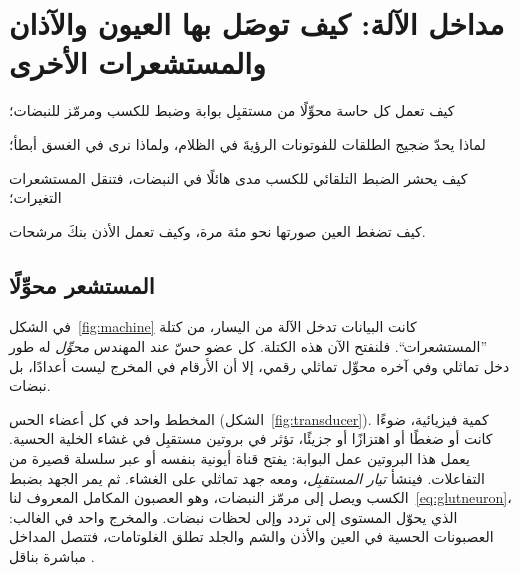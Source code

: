 \chapter{مداخل الآلة: كيف توصَل بها العيون والآذان والمستشعرات الأخرى}
\label{sec:sensors}
\begin{chaptergoals}
\item كيف تعمل كل حاسة محوِّلًا من مستقبِل بوابة وضبط للكسب ومرمّز للنبضات؛
\item لماذا يحدّ ضجيج الطلقات للفوتونات الرؤيةَ في الظلام، ولماذا نرى في الغسق أبطأ؛
\item كيف يحشر الضبط التلقائي للكسب مدى هائلًا في النبضات، فتنقل المستشعرات التغيرات؛
\item كيف تضغط العين صورتها نحو مئة مرة، وكيف تعمل الأذن بنكَ مرشحات.
\end{chaptergoals}

\section{المستشعر محوِّلًا}

في الشكل~\ref{fig:machine} كانت البيانات تدخل الآلة من اليسار، من كتلة ”المستشعرات“. فلنفتح الآن هذه الكتلة. كل عضو حسّ عند المهندس \emph{محوِّل} له طور دخل تماثلي وفي آخره محوِّل تماثلي رقمي، إلا أن الأرقام في المخرج ليست أعدادًا، بل نبضات.

المخطط واحد في كل أعضاء الحس (الشكل~\ref{fig:transducer}). كمية فيزيائية، ضوءًا كانت أو ضغطًا أو اهتزازًا أو جزيئًا، تؤثر في بروتين مستقبِل في غشاء الخلية الحسية. يعمل هذا البروتين عمل البوابة: يفتح قناة أيونية بنفسه أو عبر سلسلة قصيرة من التفاعلات. فينشأ \emph{تيار المستقبِل}، ومعه جهد تماثلي على الغشاء. ثم يمر الجهد بضبط الكسب ويصل إلى مرمّز النبضات، وهو العصبون المكامل المعروف لنا~\eqref{eq:glutneuron}، الذي يحوّل المستوى إلى تردد وإلى لحظات نبضات. والمخرج واحد في الغالب: العصبونات الحسية في العين والأذن والشم والجلد تطلق الغلوتامات، فتتصل المداخل مباشرة بناقل .

